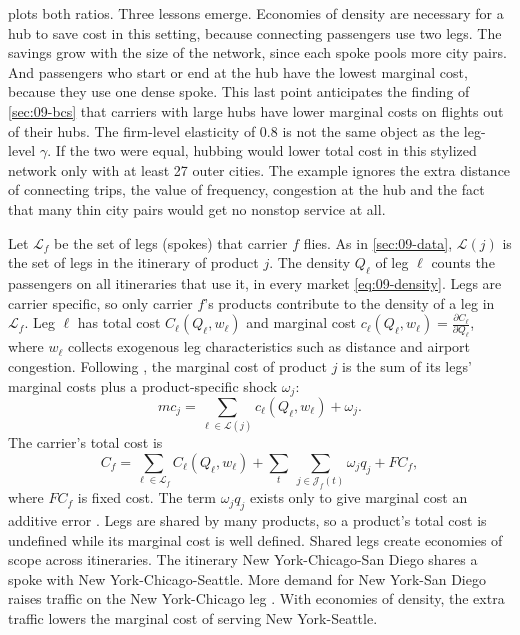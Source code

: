  plots both ratios. Three lessons emerge. Economies of density are necessary for a
hub to save cost in this setting, because connecting passengers use two legs. The savings grow with the
size of the network, since each spoke pools more city pairs. And passengers who start or end at the hub
have the lowest marginal cost, because they use one dense spoke. This last point anticipates the finding
of \cref{sec:09-bcs} that carriers with large hubs have lower marginal costs on flights out of their hubs.
The firm-level elasticity of 0.8 is not the same object as the leg-level $\gamma$. If the two were equal,
hubbing would lower total cost in this stylized network only with at least 27 outer cities. The example
ignores the extra distance of connecting trips, the value of frequency, congestion at the hub and the
fact that many thin city pairs would get no nonstop service at all.

Let $\mathcal{L}_f$ be the set of legs (spokes) that carrier $f$ flies. As in \cref{sec:09-data},
$\mathcal{L}(j)$ is the set of legs in the itinerary of product $j$. The density $Q_\ell$ of leg $\ell$
counts the passengers on all itineraries that use it, in every market \eqref{eq:09-density}. Legs are
carrier specific, so only carrier $f$'s products contribute to the density of a leg in $\mathcal{L}_f$.
Leg $\ell$ has total cost $C_\ell(Q_\ell,w_\ell)$ and marginal cost
$c_\ell(Q_\ell,w_\ell)=\frac{\partial C_\ell}{\partial Q_\ell}$, where $w_\ell$ collects exogenous leg
characteristics such as distance and airport congestion. Following \citet{BruecknerSpiller1994}, the
marginal cost of product $j$ is the sum of its legs' marginal costs plus a product-specific shock
$\omega_j$:
\begin{equation}\label{eq:09-itin-mc}
mc_j=\sum_{\ell\in\mathcal{L}(j)}c_\ell(Q_\ell,w_\ell)+\omega_j .
\end{equation}
The carrier's total cost is
\begin{equation}\label{eq:09-firm-cost}
C_f=\sum_{\ell\in\mathcal{L}_f}C_\ell(Q_\ell,w_\ell)+\sum_t\ \sum_{j\in\mathcal{J}_f(t)}\omega_jq_j+FC_f ,
\end{equation}
where $FC_f$ is fixed cost. The term $\omega_jq_j$ exists only to give marginal cost an additive error
\citep[p.~13]{BerryCarnallSpiller2006}. Legs are shared by many products, so a product's total cost is
undefined while its marginal cost is well defined. Shared legs create economies of scope across itineraries.
The itinerary New York-Chicago-San Diego shares a spoke with New York-Chicago-Seattle. More demand for New
York-San Diego raises traffic on the New York-Chicago leg \citep[p.~2, n.~5]{BerryCarnallSpiller2006}. With
economies of density, the extra traffic lowers the marginal cost of serving New York-Seattle.

